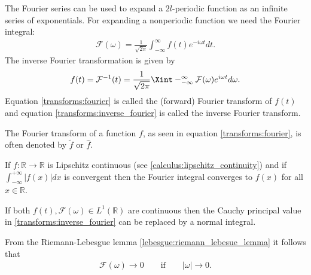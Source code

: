 	The Fourier series can be used to expand a $2l$-periodic function as an infinite series of exponentials. For expanding a nonperiodic function we need the Fourier integral:
	\begin{gather}
		\label{transforms:fourier}
		\mathcal{F}(\omega) = \frac{1}{\sqrt{2\pi}} \int_{-\infty}^{\infty}f(t)e^{-i\omega t}dt.
	\end{gather}
    The inverse Fourier transformation is given by
	\begin{gather}
		\label{transforms:inverse_fourier}
		f(t) = \mathcal{F}^{-1}(t) = \frac{1}{\sqrt{2\pi}} \Xint-_{-\infty}^{\infty}\mathcal{F}(\omega)e^{i\omega t}d\omega.
	\end{gather}
	Equation \ref{transforms:fourier} is called the (forward) Fourier transform of $f(t)$ and equation \ref{transforms:inverse_fourier} is called the inverse Fourier transform.

	\begin{notation}
		The Fourier transform of a function $f$, as seen in equation \ref{transforms:fourier}, is often denoted by $\widetilde{f}$ or $\hat{f}$.
	\end{notation}

	\begin{property}
	    	If $f:\mathbb{R}\rightarrow\mathbb{R}$ is Lipschitz continuous (see \ref{calculus:lipschitz_continuity}) and if $\int_{-\infty}^{+\infty}|f(x)|dx$ is convergent then the Fourier integral converges to $f(x)$ for all $x\in\mathbb{R}$.
	\end{property}
	\begin{theorem}
	    	If both $f(t), \mathcal{F}(\omega)\in L^1(\mathbb{R})$ are continuous then the Cauchy principal value in \ref{transforms:inverse_fourier} can be replaced by a normal integral.
	\end{theorem}

	\begin{property}
	    	From the Riemann-Lebesgue lemma \ref{lebesgue:riemann_lebesue_lemma} it follows that
	        \begin{gather}
	        	\mathcal{F}(\omega)\rightarrow0 \qquad\text{if}\qquad |\omega|\rightarrow0.
	        \end{gather}
	\end{property}

